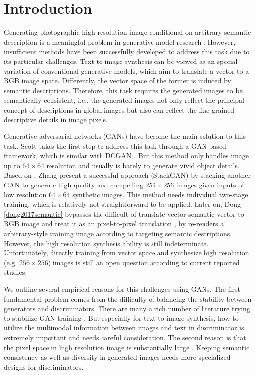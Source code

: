 \documentclass[10pt,twocolumn,letterpaper]{article}
\begin{document}
\section{Introduction}
Generating photographic high-resolution image conditional on arbitrary semantic description is a meaningful problem in generative model research \cite{reed2016generative}. However, insufficient methods have been successfully developed to address this task due to its particular challenges. Text-to-image synthesis can be viewed as an special variation of conventional generative models, which aim to translate a vector to a RGB image space.  Differently, the vector space of the former is induced by semantic descriptions. Therefore, this task requires the generated images to be semantically consistent, i.e., the generated images not only reflect the principal concept of descriptions in global images but also can reflect the fine-grained descriptive details in image pixels. 

Generative adversarial networks (GANs) have become the main solution to this task. 
Scott \etal \cite{reed2016generative} takes the first step to address this task through a GAN based framework, which is similar with DCGAN \cite{}. But this method only handles image up to $64{\times}64$ resolution and usually is barely to generate vivid object details.
Based on \cite{reed2016generative}, Zhang \etal \cite{} present a successful approach (StackGAN) by stacking another GAN to generate high quality and compelling $256{\times}256$ images given inputs of low resolution $64{\times}64$ synthetic images. This method needs individual two-stage training, which is relatively not straightforward to be applied. Later on, Dong \etal \ref{dong2017semantic} 
bypasses the difficult of translate vector semantic vector to RGB image and treat it as an pixel-to-pixel translation \cite{isola2016image}, by re-renders a arbitrary-style training image according to targeting semantic descriptions. However, the high resolution synthesis ability is still indeterminate. 
Unfortunately, directly training from vector space and synthesize high resolution (e.g. $256{\times}256$)  images is still an open question according to current reported studies. 

We outline several empirical reasons for this challenges using GANs. The first fundamental problem comes from the difficulty of balancing the stability between generators and discriminators. There are many a rich number of literature trying to stabilize GAN training \cite{}. But especially for text-to-image synthesis, how to utilize the multimodal information between images and text in discriminator is extremely important and needs careful consideration. The second reason is that the pixel space in high resolution image is substantially large \cite{han2017stackgan}. Keeping semantic consistency as well as diversity in generated images needs more specialized designs for discriminators. 
\end{document}
